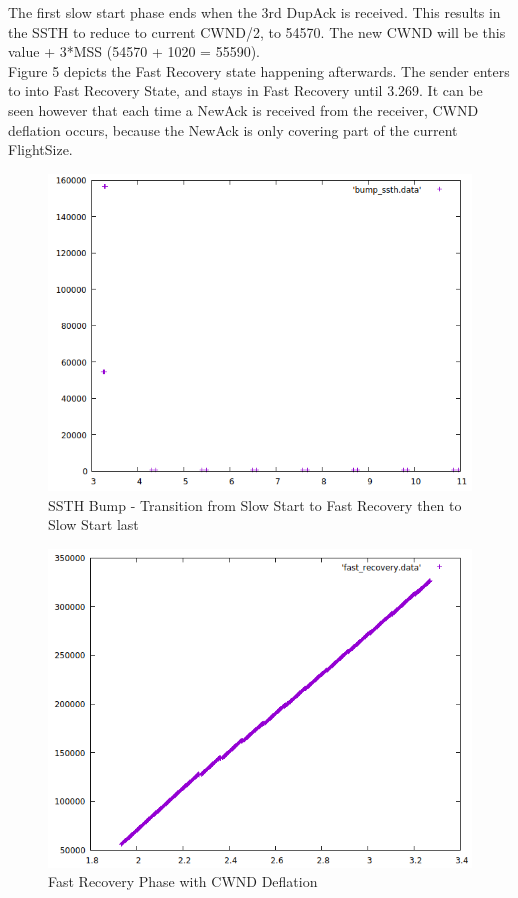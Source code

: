 \documentclass{article}
\begin{document}
The first slow start phase ends when the 3rd DupAck is received. This results in the SSTH to reduce to current CWND/2, to 54570. The new CWND will be this value + 3*MSS (54570 + 1020 = 55590).\\

Figure 5 depicts the Fast Recovery state happening afterwards. The sender enters to into Fast Recovery State, and stays in Fast Recovery until 3.269. It can be seen however that each time a NewAck is received from the receiver, CWND deflation occurs, because the NewAck is only covering part of the current FlightSize.

\begin{figure}[h]
    \centering
    \includegraphics[scale=0.4]{images/lab1-group11-task1-question3-2.png}
    \caption{SSTH Bump - Transition from Slow Start to Fast Recovery then to Slow Start last}
    \label{fig:ssth_bump}
\end{figure}

\begin{figure}[h!]
    \centering
    \includegraphics[scale=0.4]{images/lab1-group11-task1-question3-3.png}
    \caption{Fast Recovery Phase with CWND Deflation}
    \label{fig:cwnd_deflation}
\end{figure}
\end{document}
